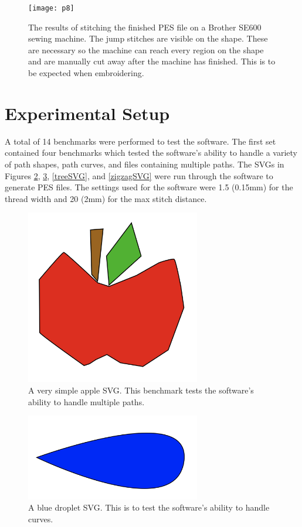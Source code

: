 \documentclass{article}
\begin{document}
\begin{figure}[H]
    \centering
    \texttt{[image: p8]}
    \caption{The results of stitching the finished PES file on a Brother SE600 sewing machine. The jump stitches are visible on the shape. These are necessary so the machine can reach every region on the shape and are manually cut away after the machine has finished. This is to be expected when embroidering.}
    \label{p8}
\end{figure}

\section{Experimental Setup}

A total of 14 benchmarks were performed to test the software. The first set contained four benchmarks which tested the software's ability to handle a variety of path shapes, path curves, and files containing multiple paths. The SVGs in Figures \ref{appleSVG}, \ref{dropletSVG}, \ref{treeSVG}, and \ref{zigzagSVG} were run through the software to generate PES files. The settings used for the software were 1.5 (0.15mm) for the thread width and 20 (2mm) for the max stitch distance.

\begin{figure}[H]
    \centering
    \includegraphics[width=3in]{appleSVG}
    \caption{A very simple apple SVG. This benchmark tests the software's ability to handle multiple paths.}
    \label{appleSVG}
\end{figure}

\begin{figure}[H]
    \centering
    \includegraphics[width=3in]{dropletSVG}
    \caption{A blue droplet SVG. This is to test the software's ability to handle curves.}
    \label{dropletSVG}
\end{figure}
\end{document}
